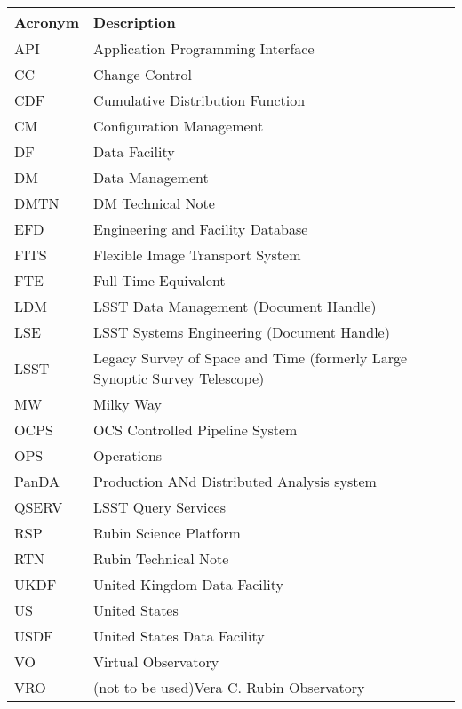 \addtocounter{table}{-1}
\begin{longtable}{p{}p{}}\hline
\textbf{Acronym} & \textbf{Description}  \\\hline

API & Application Programming Interface \\\hline
CC & Change Control \\\hline
CDF & Cumulative Distribution Function \\\hline
CM & Configuration Management \\\hline
DF & Data Facility \\\hline
DM & Data Management \\\hline
DMTN & DM Technical Note \\\hline
EFD & Engineering and Facility Database \\\hline
FITS & Flexible Image Transport System \\\hline
FTE & Full-Time Equivalent \\\hline
LDM & LSST Data Management (Document Handle) \\\hline
LSE & LSST Systems Engineering (Document Handle) \\\hline
LSST & Legacy Survey of Space and Time (formerly Large Synoptic Survey Telescope) \\\hline
MW & Milky Way \\\hline
OCPS & OCS Controlled Pipeline System \\\hline
OPS & Operations \\\hline
PanDA &  Production ANd Distributed Analysis system \\\hline
QSERV & LSST Query Services \\\hline
RSP & Rubin Science Platform \\\hline
RTN & Rubin Technical Note \\\hline
UKDF & United Kingdom Data Facility \\\hline
US & United States \\\hline
USDF & United States Data Facility \\\hline
VO & Virtual Observatory \\\hline
VRO & (not to be used)Vera C. Rubin Observatory \\\hline
\end{longtable}
